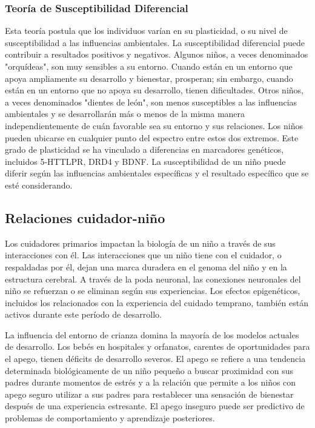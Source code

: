 \documentclass[11pt,letterpaper]{report}
\begin{document}
\subsubsection{Teoría de Susceptibilidad Diferencial}
Esta teoría postula que los individuos varían en su plasticidad, o su nivel de
susceptibilidad a las influencias ambientales. \cite{Belsky2021} La
susceptibilidad diferencial puede contribuir a resultados positivos y
negativos. Algunos niños, a veces denominados "orquídeas", son muy sensibles a
su entorno. Cuando están en un entorno que apoya ampliamente su desarrollo y
bienestar, prosperan; sin embargo, cuando están en un entorno que no apoya su
desarrollo, tienen dificultades. Otros niños, a veces denominados "dientes de
león", son menos susceptibles a las influencias ambientales y se desarrollarán
más o menos de la misma manera independientemente de cuán favorable sea su
entorno y sus relaciones. Los niños pueden ubicarse en cualquier punto del
espectro entre estos dos extremos. Este grado de plasticidad se ha vinculado a
diferencias en marcadores genéticos, incluidos 5-HTTLPR, DRD4 y BDNF.
\cite{Belsky2021} La susceptibilidad de un niño puede diferir según las
influencias ambientales específicas y el resultado específico que se esté
considerando. \cite{Feldman3}

\subsection{Relaciones cuidador-niño}
Los cuidadores primarios impactan la biología de un niño a través de sus
interacciones con él. Las interacciones que un niño tiene con el cuidador, o
respaldadas por él, dejan una marca duradera en el genoma del niño y en la
estructura cerebral. A través de la poda neuronal, las conexiones neuronales
del niño se refuerzan o se eliminan según sus experiencias. Los efectos
epigenéticos, incluidos los relacionados con la experiencia del cuidado
temprano, también están activos durante este período de desarrollo.
\cite{Roth2011}

La influencia del entorno de crianza domina la mayoría de los modelos actuales
de desarrollo. Los bebés en hospitales y orfanatos, carentes de oportunidades
para el apego, tienen déficits de desarrollo severos. El apego se refiere a
una tendencia determinada biológicamente de un niño pequeño a buscar
proximidad con sus padres durante momentos de estrés y a la relación que
permite a los niños con apego seguro utilizar a sus padres para restablecer una
sensación de bienestar después de una experiencia estresante. El apego inseguro
puede ser predictivo de problemas de comportamiento y aprendizaje posteriores.
\cite{Nelson19}
\end{document}

